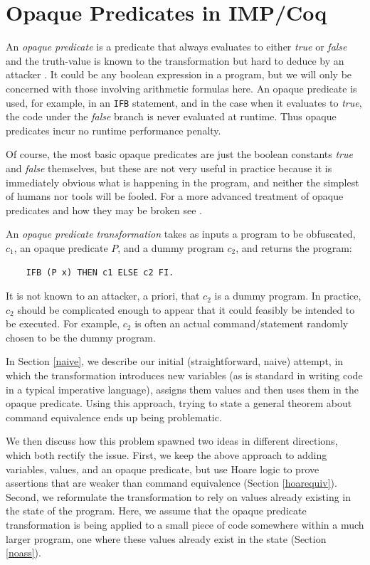 \documentclass[compsoc,conference,a4paper,10pt,times]{IEEEtran}
\begin{document}
\section{Opaque Predicates in IMP/Coq}
\label{sec:opaque}
An \emph{opaque predicate} \cite{CoNa} is a predicate that always evaluates to either \emph{true} or \emph{false} and the truth-value is known to the transformation but hard to deduce by an attacker \cite{Prada}. It could be any boolean expression in a program, but we will only be concerned with those involving arithmetic formulas here. An opaque predicate is used, for example, in an \texttt{IFB} statement, and in the case when it evaluates to \emph{true}, the code under the \emph{false} branch is never evaluated at runtime.  Thus opaque predicates incur no runtime performance penalty.

Of course, the most basic opaque predicates are just the boolean constants \emph{true} and \emph{false} themselves, but these are not very useful in practice because it is immediately obvious what is happening in the program, and neither the simplest of humans nor tools will be fooled. For a more advanced treatment of opaque predicates and how they may be broken see \cite{Prada}.

An \emph{opaque predicate transformation} takes as inputs a program to be obfuscated, $c_1$, an opaque predicate $P$, and a dummy program $c_2$, and returns the program:
\begin{verbatim}
    IFB (P x) THEN c1 ELSE c2 FI.
\end{verbatim}
It is not known to an attacker, a priori, that $c_2$ is a dummy program. In practice, $c_2$ should be complicated enough to appear that it could feasibly be intended to be executed. For example, $c_2$ is often an actual command/statement randomly chosen to be the dummy program.

In Section \ref{naive}, we describe our initial (straightforward, naive) attempt, in which the transformation introduces new variables (as is standard in writing code in a typical imperative language), assigns them values and then uses them in the opaque predicate.  Using this approach, trying to state a general theorem about command equivalence ends up being problematic.  

We then discuss how this problem spawned two ideas in different directions, which both rectify the issue. First, we keep the above approach to adding variables, values, and an opaque predicate, but use Hoare logic to prove assertions that are weaker than command equivalence (Section \ref{hoarequiv}).
Second, we reformulate the transformation to rely on values already existing in the state of the program. Here, we assume that the opaque predicate transformation is being applied to a small piece of code somewhere within a much larger program, one where these values already exist in the state (Section \ref{noass}).
\end{document}
